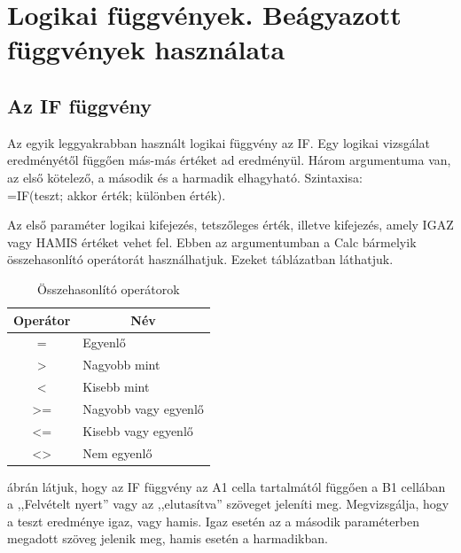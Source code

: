 \chapter{Logikai függvények. Beágyazott függvények használata}
\thispagestyle{empty}


\section{Az IF függvény}

Az egyik leggyakrabban használt logikai függvény az IF. Egy
logikai vizsgálat eredményétől függően más-más
értéket ad eredményül. Három argumentuma van, az első
kötelező, a második és a harmadik elhagyható. Szintaxisa:\\ 
=IF(teszt; akkor érték; különben érték).

Az első paraméter logikai kifejezés,  tetszőleges
érték, illetve kifejezés, amely IGAZ vagy HAMIS értéket vehet
fel. Ebben az argumentumban a Calc bármelyik összehasonlító
operátorát használhatjuk. Ezeket  táblázatban
láthatjuk.

\begin{table}[!h]
\begin{center}
\caption{Összehasonlító operátorok}\label{ÖsszehasonlítóOp}
\begin{tabular}{|c|l|}
\hline
\textbf{Operátor}&
\multicolumn{1}{c|}{\textbf{Név}} \\
\hline
=&
Egyenlő\\ \hline
\textgreater &
Nagyobb mint\\ \hline
\textless &
Kisebb mint\\ \hline
\textgreater= &
Nagyobb vagy egyenlő\\ \hline
\textless= &
Kisebb vagy egyenlő\\ \hline
\textless\textgreater &
Nem egyenlő\\ \hline
\end{tabular}
\end{center}
\end{table}

 ábrán látjuk, hogy az IF függvény az A1 cella
tartalmától függően a B1 cellában a
,,Felvételt nyert'' vagy az
,,elutasítva'' szöveget jeleníti
meg. Megvizsgálja, hogy a teszt eredménye igaz, vagy hamis. Igaz
esetén az a második paraméterben megadott szöveg jelenik meg,
hamis esetén a harmadikban.

